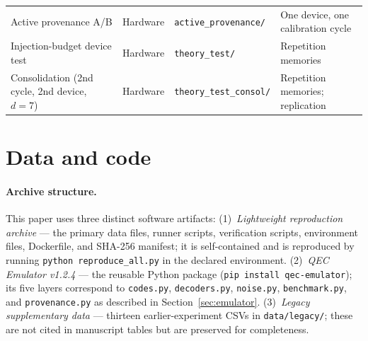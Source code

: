 \documentclass[11pt,a4paper]{article}
\begin{document}
\begin{table}[H]
\begin{tabularx}{\textwidth}{@{}p{3.1cm}p{1.7cm}X p{2.9cm}@{}}
Active provenance A/B & Hardware & \texttt{active\_provenance/} & One device, one calibration cycle \\
Injection-budget device test & Hardware & \texttt{theory\_test/} & Repetition memories \\
Consolidation (2nd cycle, 2nd device, $d{=}7$) & Hardware & \texttt{theory\_test\_consol/} & Repetition memories; replication \\
\bottomrule
\end{tabularx}
\end{table}

\section*{Data and code}

\paragraph{Archive structure.}
This paper uses three distinct software artifacts:
(1)~\emph{Lightweight reproduction archive} --- the primary data files, runner scripts, verification scripts, environment files, Dockerfile, and SHA-256 manifest; it is self-contained and is reproduced by running \texttt{python reproduce\_all.py} in the declared environment.
(2)~\emph{QEC Emulator v1.2.4} --- the reusable Python package (\texttt{pip install qec-emulator});
its five layers correspond to \texttt{codes.py}, \texttt{decoders.py}, \texttt{noise.py},
\texttt{benchmark.py}, and \texttt{provenance.py} as described in Section~\ref{sec:emulator}.
(3)~\emph{Legacy supplementary data} --- thirteen earlier-experiment CSVs
in \texttt{data/legacy/}; these are not cited in manuscript tables but are
preserved for completeness.
\end{document}
